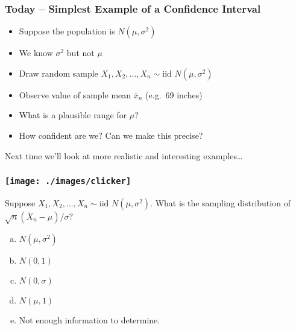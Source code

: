 \begin{frame}
  \frametitle{Today -- Simplest Example of a Confidence Interval}


\begin{itemize}
  \item Suppose the population is $N(\mu, \sigma^2)$
  \item We know $\sigma^2$ but not $\mu$
  \item Draw random sample $X_1, X_2, \hdots, X_n\sim \mbox{iid } N(\mu,\sigma^2)$ \pause
  \item Observe value of sample mean $\bar{x}_n$ (e.g.\ 69 inches) \pause
  \item What is a plausible range for $\mu$?\pause
  \item How confident are we? Can we make this precise?
\end{itemize}

\alert{Next time we'll look at more realistic and interesting examples\dots}

\end{frame}

\begin{frame}
\frametitle{\texttt{[image: ./images/clicker]}}
Suppose $X_1, X_2, \hdots, X_n \sim \mbox{iid } N(\mu,\sigma^2)$. What is the sampling distribution of $\sqrt{n}(\bar{X}_n - \mu)/\sigma$?


\begin{enumerate}[(a)]
\item $N(\mu, \sigma^2)$
\item $N(0,1)$
\item $N(0,\sigma)$
\item $N(\mu, 1)$
\item Not enough information to determine.
\end{enumerate}

\end{frame}


